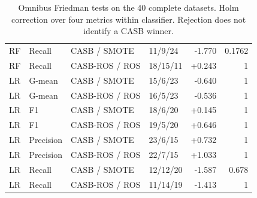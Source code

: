 \documentclass[conference]{IEEEtran}
\begin{document}
\begin{table}[!tp]
\begin{tabular}{llllrr}
RF & Recall & CASB / SMOTE & 11/9/24 & -1.770 & 0.1762 \\
RF & Recall & CASB-ROS / ROS & 18/15/11 & +0.243 & 1 \\
LR & G-mean & CASB / SMOTE & 15/6/23 & -0.640 & 1 \\
LR & G-mean & CASB-ROS / ROS & 16/5/23 & -0.536 & 1 \\
LR & F1 & CASB / SMOTE & 18/6/20 & +0.145 & 1 \\
LR & F1 & CASB-ROS / ROS & 19/5/20 & +0.646 & 1 \\
LR & Precision & CASB / SMOTE & 23/6/15 & +0.732 & 1 \\
LR & Precision & CASB-ROS / ROS & 22/7/15 & +1.033 & 1 \\
LR & Recall & CASB / SMOTE & 12/12/20 & -1.587 & 0.678 \\
LR & Recall & CASB-ROS / ROS & 11/14/19 & -1.413 & 1 \\
\bottomrule\end{tabular}
\par\vspace{10pt}
\centering
\begin{minipage}[t]{.48\textwidth}\vspace{0pt}\centering\footnotesize
\caption{Omnibus Friedman tests on the 40 complete datasets. Holm correction over four metrics within classifier. Rejection does not identify a CASB winner.}\label{tab:friedman}
\end{minipage}
\end{table}
\end{document}
